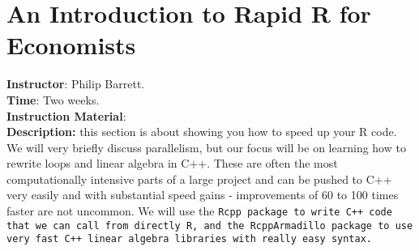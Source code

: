 \section{An Introduction to Rapid R for Economists}
\noindent \textbf{Instructor}: Philip Barrett.\\
\noindent \textbf{Time}: Two weeks.\\
\noindent \textbf{Instruction Material}: \\
\noindent \textbf{Description:} this section is about showing you how to speed up your R code.  We will very briefly discuss parallelism, but our focus will be on learning how to rewrite loops and linear algebra in C++.  These are often the most computationally intensive parts of a large project and can be pushed to C++ very easily and with substantial speed gains - improvements of 60 to 100 times faster are not uncommon.  We will use the \tt Rcpp \rm package to write C++ code that we can call from directly R, and the \tt RcppArmadillo \rm package to use very fast C++ linear algebra libraries with really easy syntax.

